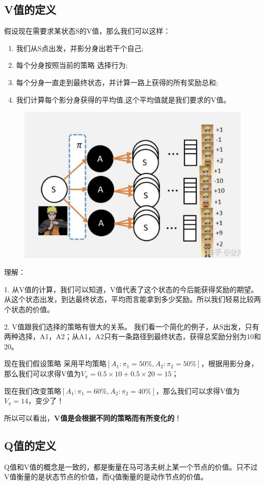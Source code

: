 \documentclass[12pt]{article}
\begin{document}
\subsection{V值的定义}
假设现在需要求某状态S的V值，那么我们可以这样：
\begin{enumerate}
\setlength{\itemsep}{0pt}
\setlength{\parsep}{0pt}
\setlength{\parskip}{0pt}
    \item 我们从S点出发，并影分身出若干个自己;
    \item 每个分身按照当前的策略 选择行为;
    \item 每个分身一直走到最终状态，并计算一路上获得的所有奖励总和;
    \item 我们计算每个影分身获得的平均值,这个平均值就是我们要求的V值。
\end{enumerate}
\begin{figure}[H]
    \centering
    \includegraphics[width=.3\textwidth]{fig/ReinforcementLearning/RL_Compute_V.png}
\end{figure}

\begin{framed}
理解：

1. 从V值的计算，我们可以知道，V值代表了这个状态的今后能获得奖励的期望。从这个状态出发，到达最终状态，平均而言能拿到多少奖励。所以我们轻易比较两个状态的价值。

2. V值跟我们选择的策略有很大的关系。 我们看一个简化的例子，从S出发，只有两种选择，A1，A2；从A1，A2只有一条路径到最终状态，获得总奖励分别为10和20。

现在我们假设策略 采用平均策略$[A_1: \pi_1 = 50\%,A_2:\pi_2 = 50\%]$，根据用影分身，那么我们可以求得V值为$V_\pi = 0.5 \times 10 + 0.5 \times 20 = 15$；

现在我们改变策略$[A_1: \pi_1 = 60\%,A_2:\pi_2 = 40\%]$，那么我们可以求得V值为$V_\pi = 14$，变少了！

所以可以看出，\textbf{V值是会根据不同的策略而有所变化的}！
\end{framed}

\subsection{Q值的定义}
Q值和V值的概念是一致的，都是衡量在马可洛夫树上某一个节点的价值。只不过V值衡量的是状态节点的价值，而Q值衡量的是动作节点的价值。
\end{document}
